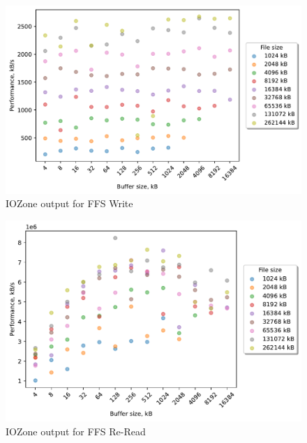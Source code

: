 \begin{figure}[!htb]
	\label{fig:bench_ffs_write}
	\begin{center}
		\includegraphics[width=1.0\textwidth]{figures.nosync/benchmarking/ffs/Write.pdf}
	\end{center}
	\caption{IOZone output for FFS Write}
\end{figure}

\begin{figure}[!htb]
	\label{fig:bench_ffs_re_read}
	\begin{center}
		\includegraphics[width=1.0\textwidth]{figures.nosync/benchmarking/ffs/Re-Read.pdf}
	\end{center}
	\caption{IOZone output for FFS \mbox{Re-Read}}
\end{figure}


